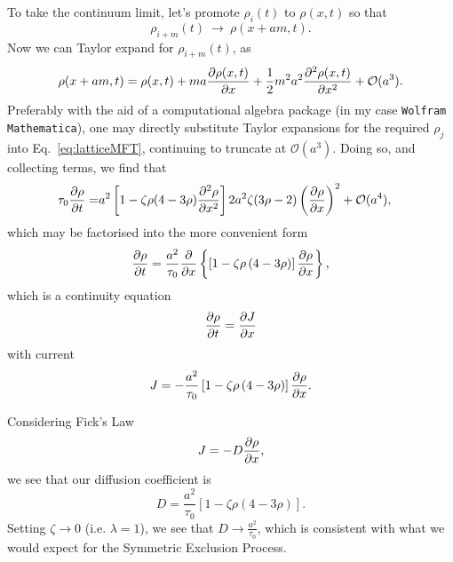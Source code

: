 To take the continuum limit, let's promote $\rho_i (t)$ to $\rho(x, t)$ so that 
\begin{equation}
\rho_{i+m}(t)~\rightarrow~\rho(x+am,t).
\end{equation}
Now we can Taylor expand for $\rho_{i+m} (t)$, as
\begin{equation}
 \rho(x+am,t) = \rho(x, t) + ma \frac{\partial \rho(x, t)}{\partial x} + \frac{1}{2} m^2 a^2 \frac{\partial ^2\rho(x, t)}{\partial x^2} + \mathcal{O}(a^3). 
\end{equation}
Preferably with the aid of a computational algebra package (in my case \texttt{Wolfram Mathematica}), one may directly substitute Taylor expansions for the required $\rho_j$ into Eq.~\ref{eq:latticeMFT}, continuing to truncate
at $\mathcal{O}(a^3)$. Doing so, and collecting terms, we find that
\begin{align}
  \tau_0 \frac{\partial \rho}{\partial t} =& a^2 \left[ 1-\zeta \rho (4-3\rho) \frac{\partial ^2 \rho}{\partial x^2}  \right]
  2 a^2 \zeta (3\rho-2) \left(\frac{\partial \rho}{\partial x}\right)^2 + \mathcal{O}(a^4) ,
\end{align}
which may be factorised into the more convenient form
\begin{equation}
\label{eq:contPDE}
 \frac{\partial \rho}{\partial t} = \frac{a^2}{\tau_0} \frac{\partial }{\partial x} \left\{ \left[1 - \zeta \rho\left(4-3\rho\right) \right] \frac{\partial \rho}{\partial x} \right\},
\end{equation}
which is a continuity equation
\begin{equation}
 \frac{\partial \rho}{\partial t} = \frac{\partial J}{\partial x} 
\end{equation}
with current
\begin{equation}
J = -\frac{a^2}{\tau_0} \left[1 - \zeta \rho\left(4-3\rho\right) \right] \frac{\partial \rho}{\partial x}.
\end{equation}

Considering Fick's Law
\begin{equation}
 J = - D \frac{\partial \rho}{\partial x},
\end{equation}
we see that our diffusion coefficient is
\begin{equation}
 D = \frac{a^2}{\tau_0} \left[1 - \zeta \rho\left(4-3\rho\right) \right].
\end{equation}
Setting $\zeta \rightarrow 0$ (i.e. $\lambda = 1$), we see that $D \rightarrow \frac{a^2}{\tau_0}$, which is consistent with what we would expect for the Symmetric Exclusion Process.

